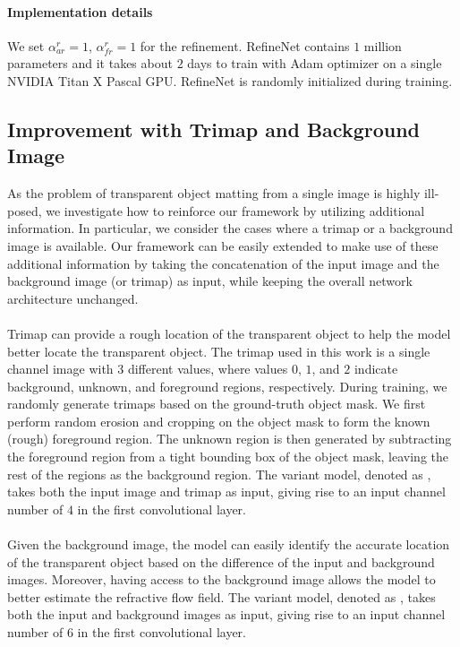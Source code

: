\paragraph{Implementation details}
\label{par:Implementation Details}
We set $\alpha^r_{ar}=1$, $\alpha^r_{fr}=1$ for the refinement. RefineNet contains $1$ million parameters and it takes about $2$ days to train with Adam optimizer on a single NVIDIA Titan X Pascal GPU. RefineNet is randomly initialized during training.
\subsection{Improvement with Trimap and Background Image}
\label{ssec:trimap}
As the problem of transparent object matting from a single image is highly ill-posed, we investigate how to reinforce our framework by utilizing additional information. 
In particular, we consider the cases where a trimap or a background image is available.
Our framework can be easily extended to make use of these additional information by taking the concatenation of the input image and the background image (or trimap) as input, while keeping the overall network architecture unchanged.

\paragraph{\TOMNetTrimap}
Trimap can provide a rough location of the transparent object to help the model better locate the transparent object. The trimap used in this work is a single channel image with $3$ different values, where values $0$, $1$, and $2$ indicate background, unknown, and foreground regions, respectively.  
During training, we randomly generate trimaps based on the ground-truth object mask. We first perform random erosion and cropping on the object mask to form the known (rough) foreground region. The unknown region is then generated by subtracting the foreground region from a tight bounding box of the object mask, leaving the rest of the regions as the background region.
The variant model, denoted as \TOMNetTrimap, takes both the input image and trimap as input, giving rise to an input channel number of $4$ in the first convolutional layer. 

\paragraph{\TOMNetBg}
Given the background image, the model can easily identify the accurate location of the transparent object based on the difference of the input and background images. Moreover, having access to the background image allows the model to better estimate the refractive flow field.
The variant model, denoted as \TOMNetBg, takes both the input and background images as input, giving rise to an input channel number of $6$ in the first convolutional layer.

